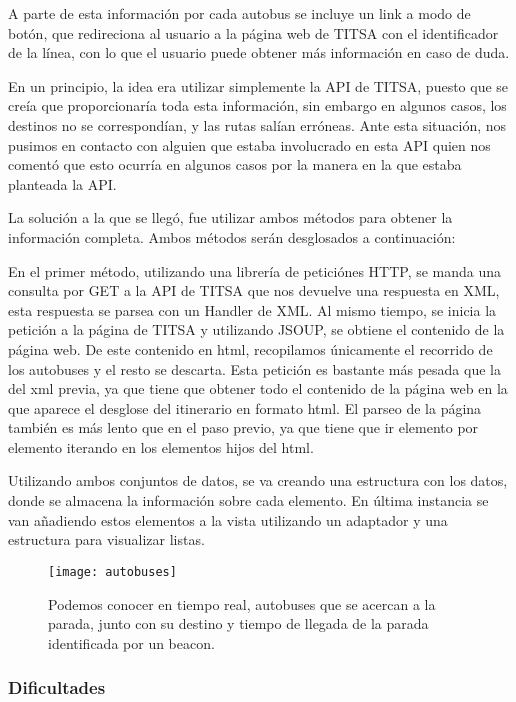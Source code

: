 A parte de esta información por cada autobus se incluye un link a modo de botón, que redireciona al usuario a la página web de TITSA con el identificador de la línea, con lo que el usuario puede obtener más información en caso de duda.

En un principio, la idea era utilizar simplemente la API de TITSA, puesto que se creía que proporcionaría toda esta información, sin embargo en algunos casos, los destinos no se correspondían, y las rutas salían erróneas. Ante esta situación, nos pusimos en contacto con alguien que estaba involucrado en esta API quien nos comentó que esto ocurría en algunos casos por la manera en la que estaba planteada la API.


La solución a la que se llegó, fue utilizar ambos métodos para obtener la información completa. Ambos métodos serán desglosados a continuación: 


En el primer método, utilizando una librería de peticiónes HTTP, se manda una consulta por GET a la API de TITSA que nos devuelve una respuesta en XML, esta respuesta se parsea con un Handler de XML. Al mismo tiempo, se inicia la petición a la página de TITSA y utilizando JSOUP, se obtiene el contenido de la página web. De este contenido en html, recopilamos únicamente el recorrido de los autobuses y el resto se descarta. Esta petición es bastante más pesada que la del xml previa, ya que tiene que obtener todo el contenido de la página web en la que aparece el desglose del itinerario en formato html. El parseo de la página también es más lento que en el paso previo, ya que tiene que ir elemento por elemento iterando en los elementos hijos del html.


Utilizando ambos conjuntos de datos, se va creando una estructura con los datos, donde se almacena la información sobre cada elemento. En última instancia se van añadiendo estos elementos a la vista utilizando un adaptador y una estructura para visualizar listas.

\begin{figure}[H]
	\centering
	\texttt{[image: autobuses]}
	\caption{Podemos conocer en tiempo real, autobuses que se acercan a la parada, junto con su destino y tiempo de llegada de la parada identificada por un beacon.}
	\label{fig:autobuses}
\end{figure}


\subsubsection{Dificultades}


